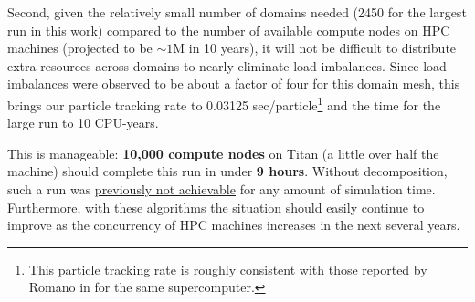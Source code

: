 \documentclass[12pt,twoside]{mitthesis-exec}
\begin{document}
Second, given the relatively small number of domains needed (2450 for the
largest run in this work) compared to the number of available compute nodes on
HPC machines (projected to be $\sim1$M in 10 years), it will not be difficult to
distribute extra resources across domains to nearly eliminate load imbalances.
Since load imbalances were observed to be about a factor of four for this domain
mesh, this brings our particle tracking rate to 0.03125
sec/particle\footnote{This particle tracking rate is roughly consistent with
those reported by Romano in \cite{Romano201320} for the same supercomputer.} and
the time for the large run to 10 CPU-years.

This is manageable: \textbf{10,000 compute nodes} on Titan (a little over half
the machine) should complete this run in under \textbf{9 hours}. Without
decomposition, such a run was \ul{previously not achievable} for any amount of
simulation time. Furthermore, with these algorithms the situation should easily
continue to improve as the concurrency of HPC machines increases in the next
several years.



\newpage

\end{document}
